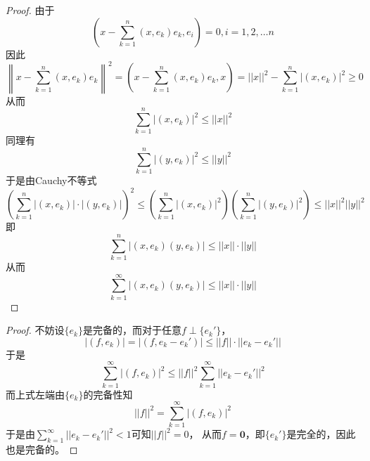 \documentclass[cn]{homework}
\begin{document}
    \problem
    \begin{proof}
        由于
        \[\left(x-\sum_{k=1}^n(x,e_k)e_k,e_i\right)=0,i=1,2,\ldots n\]
        因此
        \[\left\|x-\sum_{k=1}^n(x,e_k)e_k\right\|^2
        =\left(x-\sum_{k=1}^n(x,e_k)e_k,x\right)
        =||x||^2-\sum_{k=1}^n|(x,e_k)|^2\geq 0\]
        从而
        \[\sum_{k=1}^n|(x,e_k)|^2\leq ||x||^2\]
        同理有
        \[\sum_{k=1}^n|(y,e_k)|^2\leq ||y||^2\]
        于是由Cauchy不等式
        \[\left(\sum_{k=1}^n|(x,e_k)|\cdot|(y,e_k)|\right)^2
        \leq
        \left(\sum_{k=1}^n|(x,e_k)|^2\right)
        \left(\sum_{k=1}^n|(y,e_k)|^2\right)
        \leq ||x||^2||y||^2\]
        即
        \[\sum_{k=1}^n|(x,e_k)(y,e_k)|\leq
        ||x||\cdot||y||\]
        从而
        \[\sum_{k=1}^\infty|(x,e_k)(y,e_k)|\leq ||x||\cdot||y||\]


    \end{proof}

    \problem
    \begin{proof}
        不妨设$\{e_k\}$是完备的，而对于任意$f\perp\{e_k'\}$，
        \[|(f,e_k)|=|(f,e_k-e_k')|\leq||f||\cdot||e_k-e_k'||\]
        于是
        \[\sum_{k=1}^\infty |(f,e_k)|^2
        \leq||f||^2\sum_{k=1}^\infty||e_k-e_k'||^2\]
        而上式左端由$\{e_k\}$的完备性知
        \[||f||^2=\sum_{k=1}^\infty|(f,e_k)|^2\]
        于是由$\sum_{k=1}^\infty||e_k-e_k'||^2<1$可知$||f||^2=0$，
        从而$f=\boldsymbol 0$，即$\{e_k'\}$是完全的，因此也是完备的。
    \end{proof}
\end{document}
